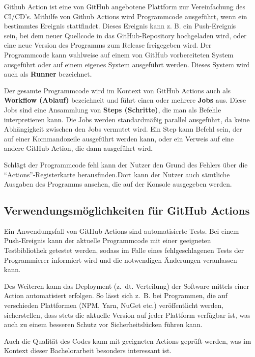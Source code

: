Github Action \cite{GithubActions} ist eine von GitHub angebotene Plattform zur Vereinfachung des \ac{CI/CD}'s. Mithilfe von  Github Actions wird Programmcode ausgeführt, wenn ein bestimmtes Ereignis stattfindet. Dieses Ereignis kann z. B. ein Push-Ereignis sein, bei dem neuer Quellcode in das GitHub-Repository hochgeladen wird, oder eine neue Version des Programms zum Release freigegeben wird. Der Programmcode kann wahlweise auf einem von  GitHub vorbereiteten System ausgeführt oder auf einem eigenes System ausgeführt werden. Dieses System wird auch als \textbf{Runner} bezeichnet.

Der gesamte Programmcode wird im Kontext von GitHub Actions auch als \textbf{Workflow (Ablauf)} bezeichneit und führt einen oder mehrere \textbf{Jobs} aus. Diese Jobs sind eine Ansammlung von \textbf{Steps (Schritte)}, die man als Befehle interpretieren kann. Die Jobs werden standardmäßig parallel ausgeführt, da keine Abhängigkeit zwischen den Jobs vermutet wird. Ein Step kann Befehl sein, der auf einer Kommandozeile ausgeführt werden kann, oder ein Verweis auf eine andere GitHub Action, die dann ausgeführt wird. 

Schlägt der Programmcode fehl kann der Nutzer den Grund des Fehlers über die  \enquote{Actions}-Registerkarte herausfinden.Dort kann der Nutzer auch sämtliche Ausgaben des Programms ansehen, die auf der Konsole ausgegeben werden.
\subsection{Verwendungsmöglichkeiten für GitHub Actions}

Ein Anwendungsfall von GitHub Actions sind automatisierte Tests. Bei einem Push-Ereignis kann der aktuelle Programmcode mit einer geeigneten Testbibliothek getestet werden, sodass im Falle eines fehlgeschlagenen Tests der Programmierer informiert wird und die notwendigen Änderungen veranlassen kann.

Des Weiteren kann das Deployment (z.~dt. Verteilung) der Software mittels einer Action automatisiert erfolgen. So lässt sich z.~B. bei Programmen, die auf verschieden Plattformen (NPM, Yarn, NuGet etc.)  veröffentlicht werden, sicherstellen, dass stets die aktuelle Version auf jeder Plattform verfügbar ist, was auch zu einem besseren Schutz vor Sicherheitslücken führen kann. 

Auch die Qualität des Codes kann mit geeigneten Actions geprüft werden, was im Kontext dieser Bachelorarbeit besonders interessant ist.  



